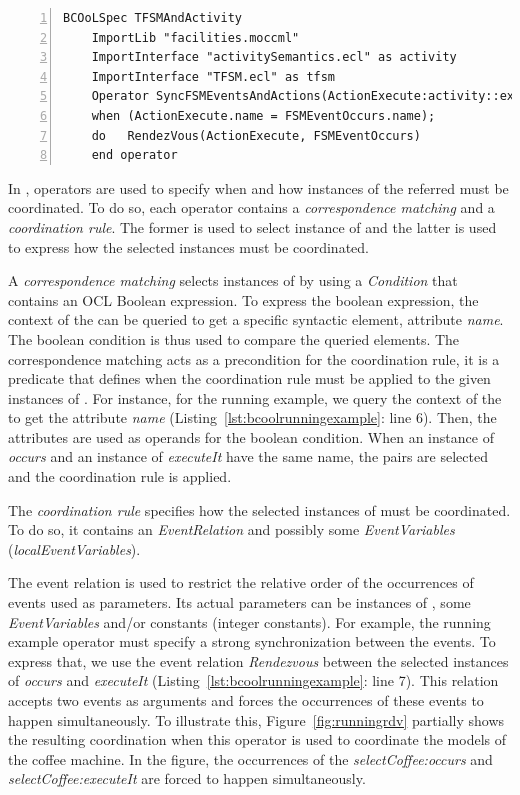 	 
	\begin{lstlisting}[language=bcool,
	caption={\bcool specification of the running example operator between the TFSM and Activity languages},
	label={lst:bcoolrunningexample}, 
	basicstyle=\scriptsize\ttfamily, backgroundcolor=\color{LGrey}, numbers=left, xleftmargin=2pt]
	BCOoLSpec TFSMAndActivity
	ImportLib "facilities.moccml"
	ImportInterface "activitySemantics.ecl" as activity
	ImportInterface "TFSM.ecl" as tfsm
	Operator SyncFSMEventsAndActions(ActionExecute:activity::executeIt, FSMEventOccurs:tfsm::occurs)
	when (ActionExecute.name = FSMEventOccurs.name);
	do   RendezVous(ActionExecute, FSMEventOccurs)
	end operator
	\end{lstlisting}
	
In \bcool, operators are used to specify when and how instances of the referred \dse must be coordinated. To do so, each operator contains a \emph{correspondence matching} and a \emph{coordination rule}. The former is used to select instance of \dse and the latter is used to express how the selected instances must be coordinated. 
	
A \emph{correspondence matching} selects instances of \dse by using a \emph{Condition} that contains an OCL Boolean expression. To express the boolean expression, the context of the \dse can be queried to get a specific syntactic element, \eg attribute \emph{name}. The boolean condition is thus used to compare the queried elements. The correspondence matching acts as a precondition for the coordination rule, \ie it is a predicate that defines when the coordination rule must be applied to the given instances of \dse. For instance, for the running example, we query the context of the \dse to get the attribute \emph{name} (Listing~\ref{lst:bcoolrunningexample}: line 6). Then, the attributes are used as operands for the boolean condition. When an instance of \dse \emph{occurs} and an instance of \dse \emph{executeIt} have the same name, the pairs are selected and the coordination rule is applied.
	
The \emph{coordination rule} specifies how the selected instances of \dse must be coordinated. To do so, it contains an \emph{EventRelation} and possibly some \emph{EventVariables} (\emph{localEventVariables}).    	
	
The event relation is used to restrict the relative order of the occurrences of events used as parameters. Its actual parameters can be instances of \dse, some \emph{EventVariables} and/or constants (\eg integer constants). For example, the running example operator must specify a strong synchronization between the events. To express that, we use the event relation \emph{Rendezvous} between the selected instances of \dse \emph{occurs} and \emph{executeIt} (Listing~\ref{lst:bcoolrunningexample}: line 7). This relation accepts two events as arguments and forces the occurrences of these events to happen simultaneously. To illustrate this, Figure~\ref{fig:runningrdv} partially shows the resulting coordination when this operator is used to coordinate the models of the coffee machine. In the figure, the occurrences of the \mse \emph{selectCoffee:occurs} and \emph{selectCoffee:executeIt} are forced to happen simultaneously.   
	
